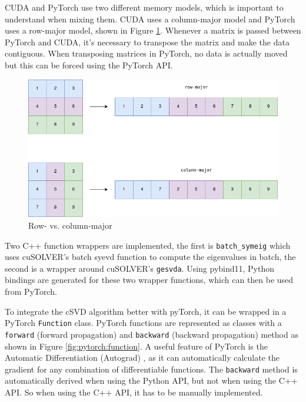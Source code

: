 CUDA and PyTorch use two different memory models, which is important to understand when mixing them. CUDA uses a column-major model and PyTorch uses a row-major model, shown in Figure \ref{fig:rowcol}. Whenever a matrix is passed between PyTorch and CUDA, it's necessary to transpose the matrix and make the data contiguous. When transposing matrices in PyTorch, no data is actually moved but this can be forced using the PyTorch API.

\begin{figure}[H]
    \centering
    \includegraphics[scale=0.45]{Figures/major.png}
    \caption{Row- vs. column-major}
    \label{fig:rowcol}
  \end{figure}

  Two C++ function wrappers are implemented, the first is \texttt{batch\_symeig} which uses cuSOLVER's batch syevd function to compute the eigenvalues in batch, the second is a wrapper around cuSOLVER's \texttt{gesvda}. Using pybind11, Python bindings are generated for these two wrapper functions, which can then be used from PyTorch.


  To integrate the cSVD algorithm better with pyTorch, it can be wrapped in a PyTorch \texttt{Function} class. PyTorch functions are represented as classes with a \texttt{forward} (forward propagation) and \texttt{backward} (backward propagation) method as shown in Figure \ref{fig:pytorch:function}. A useful feature of PyTorch is the Automatic Differentiation (Autograd) \cite{pytorch:docs}, as it can automatically calculate the gradient for any combination of differentiable functions. The \texttt{backward} method is automatically derived when using the Python API, but not when using the C++ API. So when using the C++ API, it has to be manually implemented.

